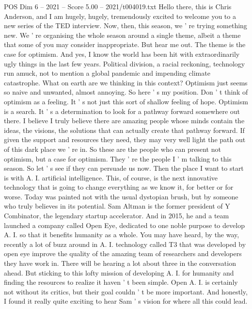 \begin{textsample}{POS Dim 6 – 2021 – Score 5.00 – 2021/t004019.txt}  \label{ex:f6_pos_076}
Hello there, this is Chris Anderson, and I am hugely, hugely, tremendously excited to welcome you to a new series of the TED interview.
Now, then, this season, we ' re trying something new.
We ' re organising the whole season around a single theme, albeit a theme that some of you may consider inappropriate.
But hear me out.
The theme is the case for optimism.
And yes, I know the world has been hit with extraordinarily ugly things in the last few years.
Political division, a racial reckoning, technology run amuck, not to mention a global pandemic and impending climate catastrophe.
What on earth are we thinking in this context?
Optimism just seems so naive and unwanted, almost annoying.
So here ' s my position.
Don ' t think of optimism as a feeling.
It ' s not just this sort of shallow feeling of hope.
Optimism is a search.
It ' s a determination to look for a pathway forward somewhere out there.
I believe I truly believe there are amazing people whose minds contain the ideas, the visions, the solutions that can actually create that pathway forward.
If given the support and resources they need, they may very well light the path out of this dark place we ' re in.
So these are the people who can present not optimism, but a case for optimism.
They ' re the people I ' m talking to this season.
So let ' s see if they can persuade us now.
Then the place I want to start is with A.
I. artificial intelligence.
This, of course, is the next innovative technology that is going to change everything as we know it, for better or for worse.
Today was painted not with the usual dystopian brush, but by someone who truly believes in its potential.
Sam Altman is the former president of Y Combinator, the legendary startup accelerator.
And in 2015, he and a team launched a company called Open Eye, dedicated to one noble purpose to develop A.
I. so that it benefits humanity as a whole.
You may have heard, by the way, recently a lot of buzz around in A.
I. technology called T3 that was developed by open eye improve the quality of the amazing team of researchers and developers they have work in.
There will be hearing a lot about three in the conversation ahead.
But sticking to this lofty mission of developing A.
I. for humanity and finding the resources to realize it haven ' t been simple.
Open A.
I. is certainly not without its critics, but their goal couldn ' t be more important.
And honestly, I found it really quite exciting to hear Sam ' s vision for where all this could lead.

\end{textsample}
